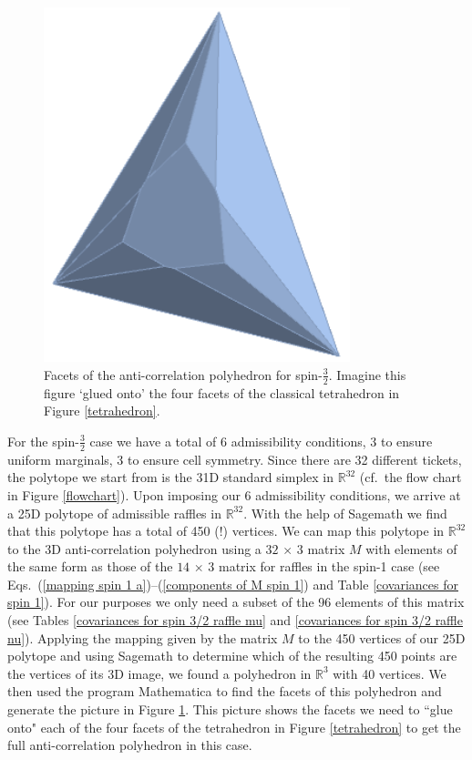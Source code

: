 \begin{figure}[h]
 \centering
   \includegraphics[width=3.5in]{SpinThreeHalfFace.png} 
   \caption{Facets of the anti-correlation polyhedron for spin-$\frac{3}{2}$. Imagine this figure `glued onto' the four facets of the classical tetrahedron in Figure \ref{tetrahedron}.}
   \label{SpinThreeHalfFace}
\end{figure}

For the spin-$\frac32$ case we have a total of 6 admissibility conditions, 3 to ensure uniform marginals, 3 to ensure cell symmetry. Since there are 32 different tickets, the polytope we start from is the 31D standard simplex in $\mathbb{R}^{32}$ (cf.\ the flow chart in Figure \ref{flowchart}). Upon imposing our 6 admissibility conditions, we arrive at a 25D polytope of admissible raffles in $\mathbb{R}^{32}$. With the help of Sagemath we find that this polytope has a total of 450 (!) vertices. We can map this polytope  in $\mathbb{R}^{32}$ to the 3D anti-correlation polyhedron using a $32 \, \times \, 3$ matrix $M$ with elements of the same form as those of the $14 \, \times \, 3$ matrix for raffles in the spin-1 case (see Eqs.\ (\ref{mapping spin 1 a})--(\ref{components of M spin 1}) and Table \ref{covariances for spin 1}). For our purposes we only need a subset of the 96 elements of this matrix (see Tables \ref{covariances for spin 3/2 raffle mu} and \ref{covariances for spin 3/2 raffle nu}). Applying the mapping given by the matrix $M$ to the 450 vertices of our 25D polytope and using Sagemath to determine which of the resulting 450 points are the vertices of its 3D image, we found a polyhedron in $\mathbb{R}^{3}$ with 40 vertices. We then used the program Mathematica to find the facets of this polyhedron and generate the picture in Figure \ref{SpinThreeHalfFace}. This picture shows the facets we need to ``glue onto" each of the four facets of the tetrahedron in Figure \ref{tetrahedron} to get the full anti-correlation polyhedron in this case.

